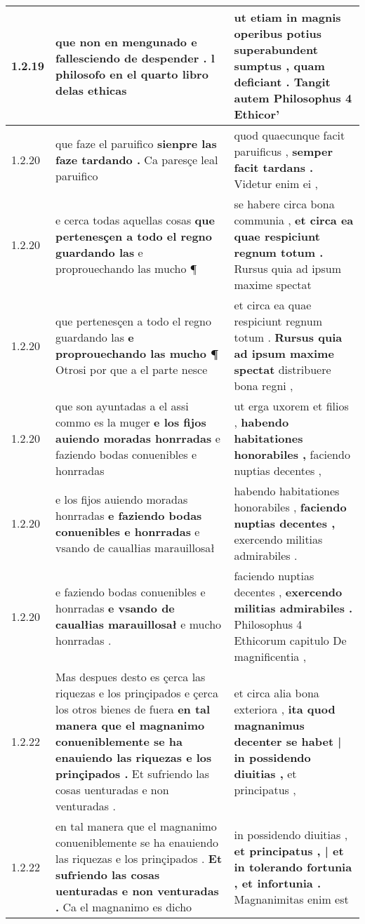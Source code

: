 \begin{tabular}{|p{1cm}|p{6.5cm}|p{6.5cm}|}
1.2.19 & que non en mengunado \textbf{ e fallesciendo de despender . } l philosofo en el quarto libro delas ethicas & ut etiam in magnis operibus potius superabundent sumptus , \textbf{ quam deficiant . } Tangit autem Philosophus 4 Ethicor’ \\\hline
1.2.20 & que faze el paruifico \textbf{ sienpre las faze tardando . } Ca paresçe leal paruifico & quod quaecunque facit paruificus , \textbf{ semper facit tardans . } Videtur enim ei , \\\hline
1.2.20 & e cerca todas aquellas cosas \textbf{ que pertenesçen a todo el regno guardando las } e proprouechando las mucho ¶ & se habere circa bona communia , \textbf{ et circa ea quae respiciunt regnum totum . } Rursus quia ad ipsum maxime spectat \\\hline
1.2.20 & que pertenesçen a todo el regno guardando las \textbf{ e proprouechando las mucho ¶ } Otrosi por que a el parte nesce & et circa ea quae respiciunt regnum totum . \textbf{ Rursus quia ad ipsum maxime spectat } distribuere bona regni , \\\hline
1.2.20 & que son ayuntadas a el assi commo es la muger \textbf{ e los fijos auiendo moradas honrradas } e faziendo bodas conuenibles e honrradas & ut erga uxorem et filios , \textbf{ habendo habitationes honorabiles , } faciendo nuptias decentes , \\\hline
1.2.20 & e los fijos auiendo moradas honrradas \textbf{ e faziendo bodas conuenibles e honrradas } e vsando de caualłias marauillosał & habendo habitationes honorabiles , \textbf{ faciendo nuptias decentes , } exercendo militias admirabiles . \\\hline
1.2.20 & e faziendo bodas conuenibles e honrradas \textbf{ e vsando de caualłias marauillosał } e mucho honrradas . & faciendo nuptias decentes , \textbf{ exercendo militias admirabiles . } Philosophus 4 Ethicorum capitulo De magnificentia , \\\hline
1.2.22 & Mas despues desto es çerca las riquezas e los prinçipados e çerca los otros bienes de fuera \textbf{ en tal manera que el magnanimo conueniblemente se ha enauiendo las riquezas e los prinçipados . } Et sufriendo las cosas uenturadas e non venturadas . & et circa alia bona exteriora , \textbf{ ita quod magnanimus decenter se habet | in possidendo diuitias , } et principatus , \\\hline
1.2.22 & en tal manera que el magnanimo conueniblemente se ha enauiendo las riquezas e los prinçipados . \textbf{ Et sufriendo las cosas uenturadas e non venturadas . } Ca el magnanimo es dicho & in possidendo diuitias , \textbf{ et principatus , | et in tolerando fortunia , et infortunia . } Magnanimitas enim est \\\hline

\end{tabular}
